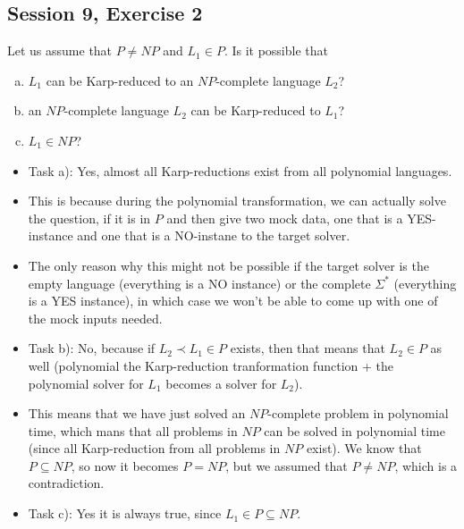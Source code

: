 \subsection {Session 9, Exercise 2}


Let us assume that $P\neq{}NP$ and $L_1 \in{} P$. Is it possible that

\begin{enumerate}[a)]
    \item $L_1$ can be Karp-reduced to an $NP$-complete language $L_2$?
    \item an $NP$-complete language $L_2$ can be Karp-reduced to $L_1$?
    \item $L_1 \in{} NP$?
    
\end{enumerate}


\begin{itemize}
    \item Task a): Yes, almost all Karp-reductions exist from all polynomial languages.
    \item This is because during the polynomial transformation, we can actually solve the question, if it is in $P$ and then give two mock data, one that is a YES-instance and one that is a NO-instane to the target solver.
    \item The only reason why this might not be possible if the target solver is the empty language (everything is a NO instance) or the complete $\Sigma^*$ (everything is a YES instance), in which case we won't be able to come up with one of the mock inputs needed.
    \item Task b): No, because if $L_2 \prec L_1 \in{} P$ exists, then that means that $L_2 \in{} P$ as well (polynomial the Karp-reduction tranformation function + the polynomial solver for $L_1$ becomes a solver for $L_2$).
    \item This means that we have just solved an $NP$-complete problem in polynomial time, which mans that all problems in $NP$ can be solved in polynomial time (since all Karp-reduction from all problems in $NP$ exist). We know that $P\subseteq{}NP$, so now it becomes $P=NP$, but we assumed that $P\neq{}NP$, which is a contradiction.
    \item Task c): Yes it is always true, since $L_1\in{}P\subseteq{}NP$.
\end{itemize}
